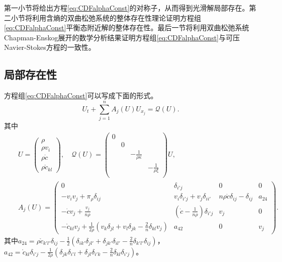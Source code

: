 	第一小节将给出方程\eqref{eq:CDFalphaConst}的对称子，从而得到光滑解局部存在。第二小节将利用含熵的双曲松弛系统的整体存在性理论证明方程组\eqref{eq:CDFalphaConst}平衡态附近解的整体存在性\cite{yong2004entropy,kawashima2009decay}。最后一节将利用双曲松弛系统Chapman-Enskog展开的数学分析结果\cite{yang2015validity}证明方程组\eqref{eq:CDFalphaConst}与可压Navier-Stokes方程的一致性。

	\subsection{局部存在性}
	方程组\eqref{eq:CDFalphaConst}可以写成下面的形式。
	\begin{equation*}
		U_t + \sum_{j=1}^n A_j(U) U_{x_j} = \mathcal{Q}(U).
	\end{equation*}
	其中
	\begin{eqnarray*} 
		&& U =\left( \begin{array}{cccc} 
			\rho \\ \rho v_i \\ \rho \dot{c} \\ \rho \mathring{c}_{kl}
		\end{array}\right), \quad 
		\mathcal{Q}(U) = 
		\left( \begin{array}{cccc} 
			0 & & & \\
			& 0 & & \\
			& &  -\frac{1}{\rho \kappa} & \\
			& & & -\frac{1}{\rho\xi}  \\
 		\end{array}\right) U, \\%
	 		&&  A_{j}(U) =
 		\left( \begin{matrix} 
 		0 & \delta_{i'j} & 0 & 0  \\
 		-v_i v_j  + \pi_\rho \delta_{ij} & v_i \delta_{i'j} + v_j \delta_{ii'}   &  n \rho \dot{c} \delta_{ij} - \delta_{ij} & a_{24}  \\
 		-\dot{c} v_j + \frac{v_j}{n \rho} & (\dot{c} - \frac{1}{n \rho}) \delta_{i'j} &  v_j & 0 \\
 		-\mathring{c}_{kl} v_j + \frac{1}{2 \rho} (v_k \delta_{jl} + v_l \delta_{jk} - \frac{2}{n} \delta_{kl} v_j) & a_{42} & 0 & v_j 
 		\end{matrix} \right).
	\end{eqnarray*}
	其中$a_{24}=\rho \mathring{c}_{k'l'} \delta_{ij}- \frac{1}{2}(\delta_{ik'}\delta_{jl'} + \delta_{jk'}\delta_{il'} - \frac{2}{n} \delta_{k'l'} \delta_{ij})$，$a_{42} =  \mathring{c}_{kl} \delta_{i'j}  - \frac{1}{2\rho} (\delta_{jk} \delta_{i'l} +　\delta_{jl} \delta_{i'k} - \frac{2}{n} \delta_{kl} \delta_{i'j})$。

